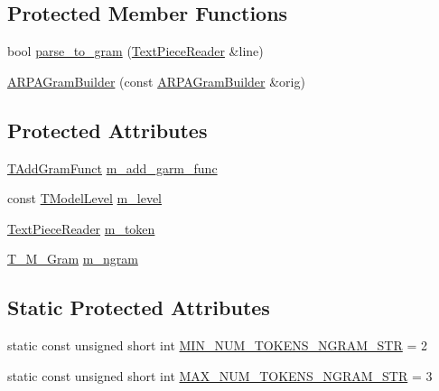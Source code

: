 \subsection*{Protected Member Functions}
\begin{DoxyCompactItemize}
\item 
bool \hyperlink{classuva_1_1smt_1_1tries_1_1arpa_1_1_a_r_p_a_gram_builder_ae6dcb98dd4b215e5d3c2d097ae5bfea9}{parse\+\_\+to\+\_\+gram} (\hyperlink{classuva_1_1smt_1_1file_1_1_text_piece_reader}{Text\+Piece\+Reader} \&line)
\item 
\hyperlink{classuva_1_1smt_1_1tries_1_1arpa_1_1_a_r_p_a_gram_builder_ad9de06a743ac014b818df81d2bec0267}{A\+R\+P\+A\+Gram\+Builder} (const \hyperlink{classuva_1_1smt_1_1tries_1_1arpa_1_1_a_r_p_a_gram_builder}{A\+R\+P\+A\+Gram\+Builder} \&orig)
\end{DoxyCompactItemize}
\subsection*{Protected Attributes}
\begin{DoxyCompactItemize}
\item 
\hyperlink{namespaceuva_1_1smt_1_1tries_1_1arpa_a9af1fc82824b7244f557bc5a265ce3f0}{T\+Add\+Gram\+Funct} \hyperlink{classuva_1_1smt_1_1tries_1_1arpa_1_1_a_r_p_a_gram_builder_a9745823f0bd6e3a5dacbd1aa503fdca3}{m\+\_\+add\+\_\+garm\+\_\+func}
\item 
const \hyperlink{namespaceuva_1_1smt_1_1tries_a20577a44b3a42d26524250634379b7cb}{T\+Model\+Level} \hyperlink{classuva_1_1smt_1_1tries_1_1arpa_1_1_a_r_p_a_gram_builder_aa7767fb74793f36e85fb8831f7981d0d}{m\+\_\+level}
\item 
\hyperlink{classuva_1_1smt_1_1file_1_1_text_piece_reader}{Text\+Piece\+Reader} \hyperlink{classuva_1_1smt_1_1tries_1_1arpa_1_1_a_r_p_a_gram_builder_ae6a6c55f9ee2e9c59ada10ea791c3dac}{m\+\_\+token}
\item 
\hyperlink{structuva_1_1smt_1_1tries_1_1mgrams_1_1_t___m___gram}{T\+\_\+\+M\+\_\+\+Gram} \hyperlink{classuva_1_1smt_1_1tries_1_1arpa_1_1_a_r_p_a_gram_builder_aeb7028b11fbfc03e795e14745e3ecf52}{m\+\_\+ngram}
\end{DoxyCompactItemize}
\subsection*{Static Protected Attributes}
\begin{DoxyCompactItemize}
\item 
static const unsigned short int \hyperlink{classuva_1_1smt_1_1tries_1_1arpa_1_1_a_r_p_a_gram_builder_acd62c4e16c9937a119d2beacd3b2247d}{M\+I\+N\+\_\+\+N\+U\+M\+\_\+\+T\+O\+K\+E\+N\+S\+\_\+\+N\+G\+R\+A\+M\+\_\+\+S\+T\+R} = 2
\item 
static const unsigned short int \hyperlink{classuva_1_1smt_1_1tries_1_1arpa_1_1_a_r_p_a_gram_builder_a45bad72450a6948351de0cfaa1339f3c}{M\+A\+X\+\_\+\+N\+U\+M\+\_\+\+T\+O\+K\+E\+N\+S\+\_\+\+N\+G\+R\+A\+M\+\_\+\+S\+T\+R} = 3
\end{DoxyCompactItemize}


